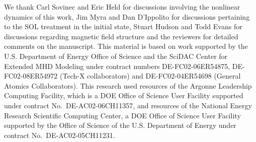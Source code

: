 \documentclass[english,aps,superscriptaddress,showkeys,showpacs,prepri,twocolumn]{revtex4}
\begin{document}
\begin{acknowledgments}
We thank Carl Sovinec and Eric Held for discussions involving the nonlinear
dynamics of this work, Jim Myra and Dan D'Ippolito for discussions pertaining
to the SOL treatment in the initial state, Stuart Hudson and Todd Evans for
discussions regarding magnetic field structure and the reviewers for detailed
comments on the manuscript. This material is based on work supported by the
U.S.  Department of Energy Office of Science and the SciDAC Center for Extended
MHD Modeling under contract numbers DE-FC02-06ER54875, DE-FC02-08ER54972
(Tech-X collaborators) and DE-FC02-04ER54698 (General Atomics Collaborators).
This research used resources of the Argonne Leadership Computing Facility,
which is a DOE Office of Science User Facility supported under contract
No.~DE-AC02-06CH11357,  and resources of the National Energy Research
Scientific Computing Center, a DOE Office of Science User Facility supported by
the Office of Science of the U.S.  Department of Energy under contract
No.~DE-AC02-05CH11231.
\end{acknowledgments}



\end{document}
